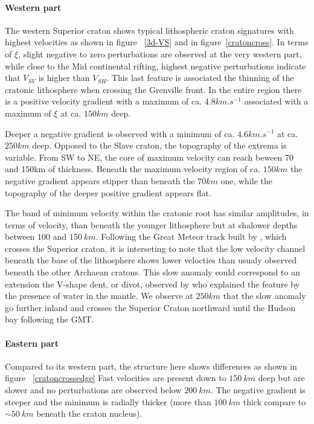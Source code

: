 \documentclass[12pt]{article}
\begin{document}
		\paragraph{Western part}
			The western Superior craton shows typical lithospheric craton signatures with highest velocities as shown in figure ~\ref{3d-VS} and in figure~\ref{cratoncross}. In terms of $\xi$, slight negative to zero perturbations are observed at the very western part, while close to the Mid continental rifting, highest negative perturbations indicate that $V_{SV}$ is higher than $V_{SH}$. This last feature is associated the thinning of the cratonic lithosphere when crossing the Grenville front.
			In the entire region there is a positive velocity gradient with a maximum of ca. $4.8km.s^{-1}$  associated with a maximum of $\xi$ at ca. $150km$ deep.
			
			Deeper a negative gradient is observed with a minimum of ca. $4.6km.s^{-1}$ at ca. $250km$ deep. 
			Opposed to the Slave craton, the topography of the extrema is variable. 
			From SW to NE, the core of maximum velocity can reach beween 70 and 150km of thickness. 
			Beneath the maximum velocity region of ca. $150km$ the negative gradient appears stipper than beneath the $70km$ one, while the topography of the deeper positive gradient appears flat. 
			 
			The band of minimum velocity within the cratonic root has similar amplitudes, in terms of velocity, than beneath the younger lithosphere but at shalower depths between $100$ and $150 \: km$. 
			Following the Great Meteor track built by \cite{heaman2000timing}, which crosses the Superior craton, it is interseting to note that the low velocity channel beneath the base of the lithosphere shows lower velocties than usualy observed beneath the other Archaean cratons. 
			This slow anomaly could correspond to an extension the V-shape dent, or divot, observed by \cite{lee1997upper} who explained the feature by the presence of water in the mantle. 
			We observe at $250km$ that the slow anomaly go further inland and crosses the Superior Craton northward until the Hudson bay following the GMT.

		\paragraph{Eastern part}
			Compared to its western part, the structure here shows differences as shown in figure ~\ref{cratoncrossedge} 
			Fast velocities are present down to $150 \: km$ deep but are slower and no perturbations are observed below $200 \: km$. 
			The negative gradient is steeper and the minimum is radially thicker (more than $100 \: km$ thick compare to $\sim 50 \: km$ beneath the craton nucleus). 
\end{document}
